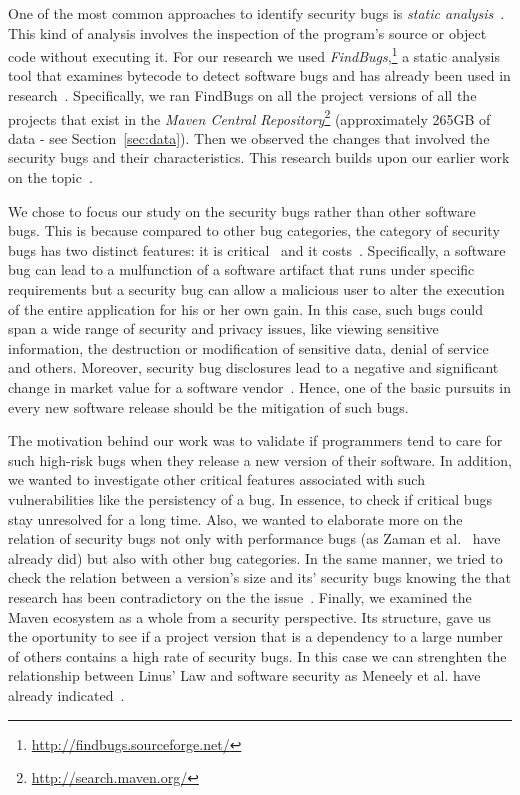 \documentclass[conference]{llncs}
\begin{document}
One of the most common approaches to identify security bugs is
{\it static analysis}~\cite{CW07}. This kind of analysis involves the
inspection of the program's source or object code without executing
it. For our research we used {\it FindBugs},\footnote{\url{http://findbugs.sourceforge.net/}}
a static analysis tool that examines bytecode to detect software bugs and has already been used in
research~\cite{AP10}\cite{HP07}\cite{HP04}\cite{HW08}\cite{SHP06}.
Specifically, we ran FindBugs on all the project
versions of all the projects that exist in the
{\it Maven Central Repository}\footnote{\url{http://search.maven.org/}}
(approximately 265GB of data - see Section~\ref{sec:data}).
Then we observed the changes that involved the security bugs and their characteristics.
This research builds upon our earlier work on the topic~\cite{MGS12}.

We chose to focus our study on the security bugs rather than other
software bugs. This is because compared to other bug categories,
the category of security bugs has two distinct features: it is critical~\cite{SZ12}
and it costs~\cite{BCL08}. Specifically, a software bug can
lead to a mulfunction of a software artifact that runs under specific
requirements but a security bug can allow a malicious user to alter the execution
of the entire application for his or her own gain. In this case, such bugs could span a wide
range of security and privacy issues, like viewing sensitive information, the destruction or
modification of sensitive data, denial of service and others.
Moreover, security bug disclosures lead to a negative and significant change
in market value for a software vendor~\cite{TW07}.
Hence, one of the basic pursuits in every new software release should
be the mitigation of such bugs.

The motivation behind our work was to validate if programmers tend to care for
such high-risk bugs when they release a new version of their software. In
addition, we wanted to investigate other critical features associated with such
vulnerabilities like the persistency of a bug. In essence, to check if critical bugs stay
unresolved for a long time. Also, we wanted to elaborate more on the relation of security
bugs not only with performance bugs (as Zaman et al.~\cite{ZAH11} have already
did) but also with other bug categories. In the same manner, we tried to check
the relation between a version's size and its' security bugs knowing the
that research has been contradictory on the the
issue~\cite{BP84}\cite{SYTP85}\cite{NBZ06}\cite{GKMS00}.
Finally, we examined the Maven ecosystem as a whole from a security
perspective. Its structure, gave us the oportunity to see if a project version that is a dependency to
a large number of others contains a high rate of security bugs.
In this case we can strenghten the relationship between Linus' Law and
software security as Meneely et al. have already indicated~\cite{MW10}.
\end{document}

